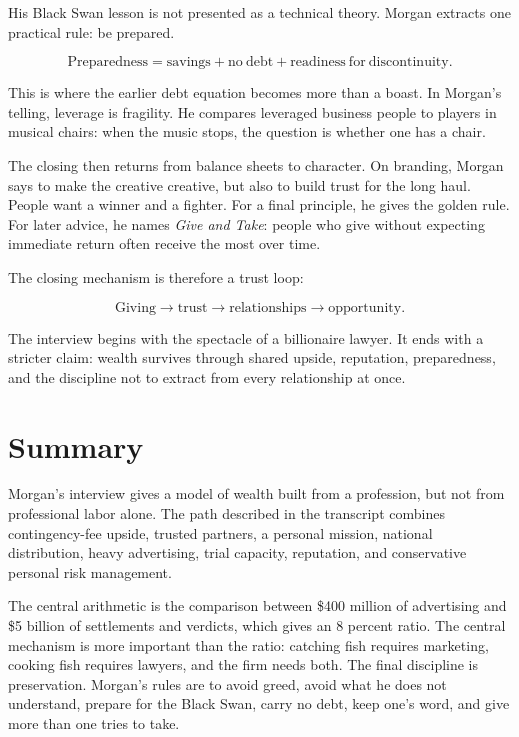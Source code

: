 His Black Swan lesson is not presented as a technical theory. Morgan extracts one practical rule: be prepared.

\begin{equation}
\mathrm{Preparedness}
=
\mathrm{savings}
+
\mathrm{no\ debt}
+
\mathrm{readiness\ for\ discontinuity}.
\end{equation}

This is where the earlier debt equation becomes more than a boast. In Morgan's telling, leverage is fragility. He compares leveraged business people to players in musical chairs: when the music stops, the question is whether one has a chair.

The closing then returns from balance sheets to character. On branding, Morgan says to make the creative creative, but also to build trust for the long haul. People want a winner and a fighter. For a final principle, he gives the golden rule. For later advice, he names \emph{Give and Take}: people who give without expecting immediate return often receive the most over time.

The closing mechanism is therefore a trust loop:

\begin{equation}
\mathrm{Giving}
\longrightarrow
\mathrm{trust}
\longrightarrow
\mathrm{relationships}
\longrightarrow
\mathrm{opportunity}.
\end{equation}

The interview begins with the spectacle of a billionaire lawyer. It ends with a stricter claim: wealth survives through shared upside, reputation, preparedness, and the discipline not to extract from every relationship at once.

\section{Summary}

Morgan's interview gives a model of wealth built from a profession, but not from professional labor alone. The path described in the transcript combines contingency-fee upside, trusted partners, a personal mission, national distribution, heavy advertising, trial capacity, reputation, and conservative personal risk management.

The central arithmetic is the comparison between \$400 million of advertising and \$5 billion of settlements and verdicts, which gives an 8 percent ratio. The central mechanism is more important than the ratio: catching fish requires marketing, cooking fish requires lawyers, and the firm needs both. The final discipline is preservation. Morgan's rules are to avoid greed, avoid what he does not understand, prepare for the Black Swan, carry no debt, keep one's word, and give more than one tries to take.